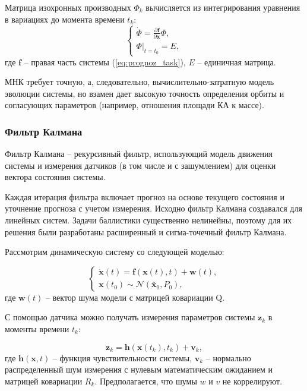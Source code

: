 Матрица изохронных производных $\Phi_k$ вычисляется 
из интегрирования уравнения в вариациях до момента времени $t_k$:
\begin{equation}
    \begin{cases}
        \dot{\Phi} = \frac{\partial \mathbf{f}}{\partial \mathbf{x}} \Phi, \\
        \Phi \big|_{t = t_0} = E,
        \label{eq:prognoz_phi}
    \end{cases}
\end{equation}
где $\mathbf{f}$ -- правая часть системы (\ref{eq:prognoz_task}), $E$ -- единичная матрица.

МНК требует точную, а, следовательно, вычислительно-затратную модель эволюции системы, но
взамен дает высокую точность определения орбиты и согласующих параметров (например,
отношения площади КА к массе).

\subsubsection{Фильтр Калмана}
Фильтр Калмана -- рекурсивный фильтр, использующий модель движения системы и
измерения датчиков (в том числе и с зашумлением) для оценки вектора состояния системы.

Каждая итерация фильтра включает прогноз на основе текущего состояния и уточнение прогноза
с учетом измерения. Исходно фильтр Калмана создавался для линейных систем. Задачи
баллистики существенно нелинейны, поэтому для их решения были разработаны 
расширенный и сигма-точечный фильтр Калмана. 

Рассмотрим динамическую систему со следующей моделью:

\begin{equation*}
    \begin{cases}
        \dot{\mathbf{x}}(t) = \mathbf{f}(\mathbf{x}(t), t) + \mathbf{w}(t), \\
        \mathbf{x}(t_0) \sim \mathcal{N}\left(\bar{\mathbf{x}}_0, P_0 \right),
    \end{cases}
\end{equation*}
где $\mathbf{w}(t)$ -- вектор шума модели с матрицей ковариации Q.

С помощью датчика можно получать измерения параметров системы $\mathbf{z}_k$ в моменты времени $t_k$:

\begin{equation*}
    \mathbf{z}_k = \mathbf{h} (\mathbf{x}(t_k), t_k) + \mathbf{v}_k,
\end{equation*}
где $\mathbf{h} (\mathbf{x}, t)$ -- функция чувствительности системы, $\mathbf{v}_k$ --
нормально распределенный шум измерения с нулевым математическим ожиданием и матрицей
ковариации $R_k$. Предполагается, что шумы $w$ и $v$ не коррелируют.

